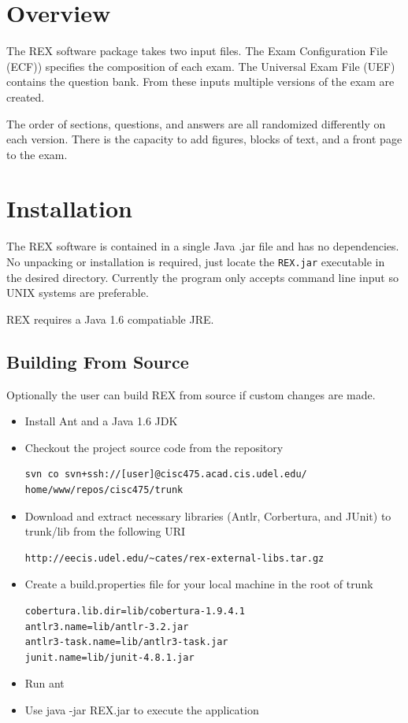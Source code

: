 \documentclass{article}
\begin{document}
\section{Overview}
The REX software package takes two input files. The Exam Configuration File
(ECF)) specifies the composition of each exam. The Universal Exam File
(UEF) contains the question bank. From these inputs multiple versions of the
exam are created. 

The order of sections, questions, and answers are all randomized differently on each version. There is the capacity to add figures,
blocks of text, and a front page to the exam. 


\section{Installation}
The REX software is contained in a single Java .jar file and has no
dependencies. No unpacking or installation is required, just locate the
\texttt{REX.jar} executable in the desired directory. Currently the program
only accepts command line input so UNIX systems are preferable. 

REX requires a Java 1.6 compatiable JRE. 

\subsection{Building From Source}
Optionally the user can build REX from source if custom changes are made. 
\begin{itemize}
\item Install Ant and a Java 1.6 JDK
\item Checkout the project source code from the repository
\begin{verbatim}
svn co svn+ssh://[user]@cisc475.acad.cis.udel.edu/
home/www/repos/cisc475/trunk
\end{verbatim}
\item Download and extract necessary libraries (Antlr, Corbertura, and JUnit) to
trunk/lib from the following URI
\begin{verbatim}
http://eecis.udel.edu/~cates/rex-external-libs.tar.gz
\end{verbatim}
\item Create a build.properties file for your local machine in the root of trunk
\begin{verbatim}
cobertura.lib.dir=lib/cobertura-1.9.4.1
antlr3.name=lib/antlr-3.2.jar
antlr3-task.name=lib/antlr3-task.jar
junit.name=lib/junit-4.8.1.jar
\end{verbatim}
\item Run ant
\item Use java -jar REX.jar to execute the application
\end{itemize}
\end{document}
